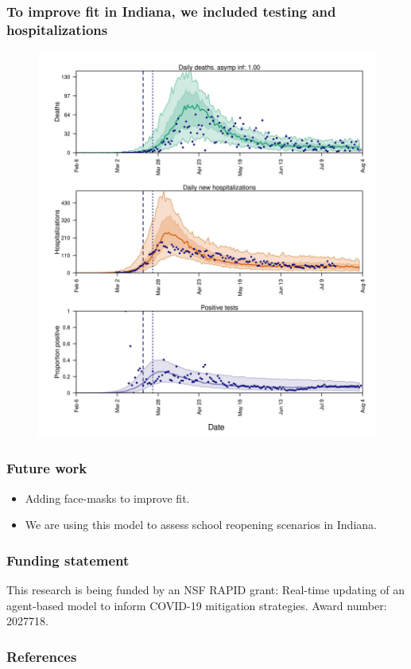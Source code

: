\documentclass[usenames,dvipsnames]{beamer}
\begin{document}
\begin{frame}
  \frametitle{To improve fit in Indiana, we included testing and hospitalizations}
  \begin{figure}
    \includegraphics[height=0.8\textheight]{./figures/manuscript_figure_deaths_fit.jpeg}
  \end{figure}
\end{frame}


\begin{frame}
  \frametitle{Future work}
  \begin{itemize}
  \item Adding face-masks to improve fit.
  \item We are using this model to assess school reopening scenarios in Indiana.
  \end{itemize}    
\end{frame}

\begin{frame}
  \frametitle{Funding statement}
  This research is being funded by an NSF RAPID grant: Real-time updating of an agent-based model to inform COVID-19 mitigation strategies. Award number: 2027718.
\end{frame}

\begin{frame}[t,allowframebreaks]
  \frametitle{References}
  \printbibliography
\end{frame}
% 
\end{document}
